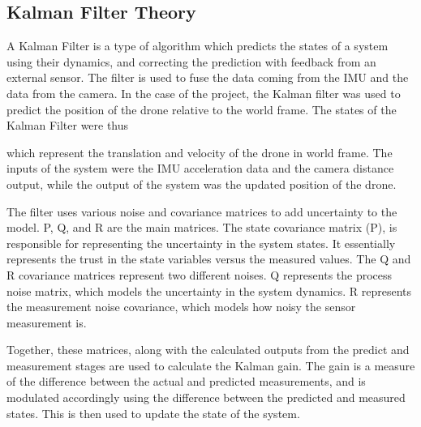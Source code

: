 \documentclass[bare_jrnl_transmag]{subfiles}
\begin{document}
\subsection{Kalman Filter Theory}
A Kalman Filter is a type of algorithm which predicts the states of a system using their dynamics, and correcting the prediction with feedback from an external sensor. The filter is used to fuse the data coming from the IMU and the data from the camera. 
In the case of the project, the Kalman filter was used to predict the position of the drone relative to the world frame. The states of the Kalman Filter were thus 

\begin{equation} 
    [ t_x, t_y, t_z, v_x, v_y, v_z ] 
\end{equation}  which represent the translation and velocity of the drone in world frame. 
The inputs of the system were the IMU acceleration data and the camera distance output, while the output of the system was the updated position of the drone.\newline

The filter uses various noise and covariance matrices to add uncertainty to the model. P, Q, and R are the main matrices. The state covariance matrix (P), is responsible for representing the uncertainty in the system states. It essentially represents the trust in the state variables versus the measured values.
The Q and R covariance matrices represent two different noises. Q represents the process noise matrix, which models the uncertainty in the system dynamics. R represents the measurement noise covariance, which models how noisy the sensor measurement is.\newline

Together, these matrices, along with the calculated outputs from the predict and measurement stages are used to calculate the Kalman gain. The gain is a measure of the difference between the actual and predicted measurements, and is modulated accordingly using the difference between the predicted and measured states. This is then used to update the state of the system.
\end{document}
